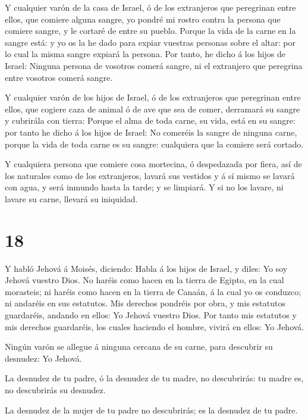  Y cualquier varón de la casa de Israel, ó de los
extranjeros que peregrinan entre ellos, que comiere alguna sangre, yo
pondré mi rostro contra la persona que comiere sangre, y le cortaré de
entre su pueblo.  Porque la vida de la carne en la sangre
está: y yo os la he dado para expiar vuestras personas sobre el altar:
por lo cual la misma sangre expiará la persona.  Por tanto,
he dicho á los hijos de Israel: Ninguna persona de vosotros comerá
sangre, ni el extranjero que peregrina entre vosotros comerá sangre.

 Y cualquier varón de los hijos de Israel, ó de los
extranjeros que peregrinan entre ellos, que cogiere caza de animal ó de
ave que sea de comer, derramará su sangre y cubrirála con tierra:
 Porque el alma de toda carne, su vida, está en su sangre:
por tanto he dicho á los hijos de Israel: No comeréis la sangre de
ninguna carne, porque la vida de toda carne es su sangre: cualquiera que
la comiere será cortado.

 Y cualquiera persona que comiere cosa mortecina, ó
despedazada por fiera, así de los naturales como de los extranjeros,
lavará sus vestidos y á sí mismo se lavará con agua, y será inmundo
hasta la tarde; y se limpiará.  Y si no los lavare, ni
lavare su carne, llevará su iniquidad.

\hypertarget{section-17}{%
\section{18}\label{section-17}}

 Y habló Jehová á Moisés, diciendo:  Habla á los
hijos de Israel, y diles: Yo soy Jehová vuestro Dios.  No
haréis como hacen en la tierra de Egipto, en la cual morasteis; ni
haréis como hacen en la tierra de Canaán, á la cual yo os conduzco; ni
andaréis en sus estatutos.  Mis derechos pondréis por obra,
y mis estatutos guardaréis, andando en ellos: Yo Jehová vuestro Dios.
 Por tanto mis estatutos y mis derechos guardaréis, los
cuales haciendo el hombre, vivirá en ellos: Yo Jehová.

 Ningún varón se allegue á ninguna cercana de su carne, para
descubrir su desnudez: Yo Jehová.

 La desnudez de tu padre, ó la desnudez de tu madre, no
descubrirás: tu madre es, no descubrirás su desnudez.

 La desnudez de la mujer de tu padre no descubrirás; es la
desnudez de tu padre.

